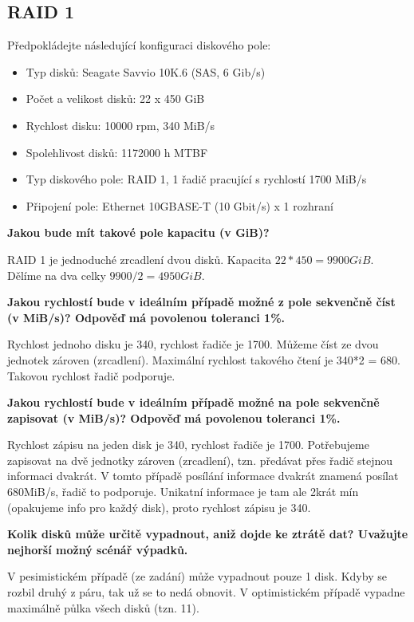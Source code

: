 \subsection{RAID 1}
Předpokládejte následující konfiguraci diskového pole:

\begin{itemize}
    \item Typ disků: Seagate Savvio 10K.6 (SAS, 6 Gib/s)
    \item Počet a velikost disků: 22 x 450 GiB
    \item Rychlost disku: 10000 rpm, 340 MiB/s
    \item Spolehlivost disků: 1172000 h MTBF
    \item Typ diskového pole: RAID 1, 1 řadič pracující s rychlostí 1700 MiB/s
    \item Připojení pole: Ethernet 10GBASE-T (10 Gbit/s) x 1 rozhraní
\end{itemize}


\textbf{Jakou bude mít takové pole kapacitu (v GiB)?}

RAID 1 je jednoduché zrcadlení dvou disků. Kapacita $22*450 = 9900GiB$. Dělíme na dva celky $9900/2 = 4950GiB$.

\textbf{Jakou rychlostí bude v ideálním případě možné z pole sekvenčně číst (v MiB/s)? Odpověď má povolenou toleranci 1\%.}

Rychlost jednoho disku je 340, rychlost řadiče je 1700. Můžeme číst ze dvou jednotek zároven (zrcadlení). Maximální rychlost takového čtení je 340*2 = 680. Takovou rychlost řadič podporuje.

\textbf{Jakou rychlostí bude v ideálním případě možné na pole sekvenčně zapisovat (v MiB/s)? Odpověď má povolenou toleranci 1\%.}

Rychlost zápisu na jeden disk je 340, rychlost řadiče je 1700. Potřebujeme zapisovat na dvě jednotky zároven (zrcadlení), tzn. předávat přes řadič stejnou informaci dvakrát. V tomto případě posílání informace dvakrát znamená posílat 680MiB/s, řadič to podporuje. Unikatní informace je tam ale 2krát mín (opakujeme info pro každý disk), proto rychlost zápisu je 340.

\textbf{Kolik disků může určitě vypadnout, aniž dojde ke ztrátě dat? Uvažujte nejhorší možný scénář výpadků.}

V pesimistickém případě (ze zadání) může vypadnout pouze 1 disk. Kdyby se rozbil druhý z páru, tak už se to nedá obnovit. V optimistickém případě vypadne maximálně půlka všech disků (tzn. 11).

